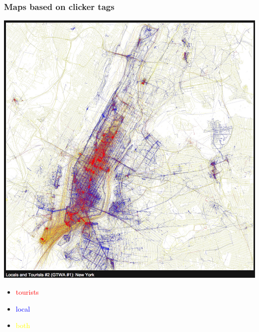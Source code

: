 \documentclass[slidestop,compress,mathserif,12pt,t,professionalfonts,xcolor=table]{beamer}
\begin{document}
\begin{frame}
\frametitle{Maps based on clicker tags}

{
\begin{center}
\includegraphics[width=\textwidth]{figures/flickr_ny}
\end{center}
}
{
\begin{itemize}
\item[] \textcolor{red}{tourists}
\item[] \textcolor{blue}{local}
\item[] \textcolor{yellow}{both}
\end{itemize}
}


\note{
\small

}
\end{frame}
\end{document}
